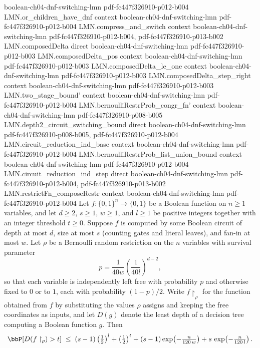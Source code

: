 \begin{theorem}
  {boolean-ch04-dnf-switching-lmn}
  {pdf-fc447f326910-p012-b004}
\proofstep
  {LMN.or_children_have_dnf}
  {context}
  {boolean-ch04-dnf-switching-lmn}
  {pdf-fc447f326910-p012-b004}
\proofstep
  {LMN.compress_and_switch}
  {context}
  {boolean-ch04-dnf-switching-lmn}
  {pdf-fc447f326910-p012-b004,
    pdf-fc447f326910-p013-b002}
\proofstep
  {LMN.composedDelta}
  {direct}
  {boolean-ch04-dnf-switching-lmn}
  {pdf-fc447f326910-p012-b003}
\proofstep
  {LMN.composedDelta_pos}
  {context}
  {boolean-ch04-dnf-switching-lmn}
  {pdf-fc447f326910-p012-b003}
\proofstep
  {LMN.composedDelta_le_one}
  {context}
  {boolean-ch04-dnf-switching-lmn}
  {pdf-fc447f326910-p012-b003}
\proofstep
  {LMN.composedDelta_step_right}
  {context}
  {boolean-ch04-dnf-switching-lmn}
  {pdf-fc447f326910-p012-b003}
\proofstep
  {LMN.two_stage_bound'}
  {context}
  {boolean-ch04-dnf-switching-lmn}
  {pdf-fc447f326910-p012-b004}
\proofstep
  {LMN.bernoulliRestrProb_congr_fn'}
  {context}
  {boolean-ch04-dnf-switching-lmn}
  {pdf-fc447f326910-p008-b005}
\proofstep
  {LMN.depth2_circuit_switching_bound}
  {direct}
  {boolean-ch04-dnf-switching-lmn}
  {pdf-fc447f326910-p008-b005,
    pdf-fc447f326910-p012-b004}
\proofstep
  {LMN.circuit_reduction_ind_base}
  {context}
  {boolean-ch04-dnf-switching-lmn}
  {pdf-fc447f326910-p012-b004}
\proofstep
  {LMN.bernoulliRestrProb_list_union_bound}
  {context}
  {boolean-ch04-dnf-switching-lmn}
  {pdf-fc447f326910-p012-b004}
\proofstep
  {LMN.circuit_reduction_ind_step}
  {direct}
  {boolean-ch04-dnf-switching-lmn}
  {pdf-fc447f326910-p012-b004,
    pdf-fc447f326910-p013-b002}
\proofstep
  {LMN.restrictFn_composeRestr}
  {context}
  {boolean-ch04-dnf-switching-lmn}
  {pdf-fc447f326910-p012-b004}
Let $f\colon\{0,1\}^n\to\{0,1\}$ be a Boolean function on $n\ge 1$ variables, and let
$d\ge 2$, $s\ge 1$, $w\ge 1$, and $l\ge 1$ be positive integers together with an integer
threshold $t\ge 0$. Suppose $f$ is computed by some Boolean circuit of depth at most
$d$, size at most $s$ (counting gates and literal leaves), and fan-in at most $w$. Let
$\rho$ be a Bernoulli random restriction on the $n$ variables with survival parameter
\[
  p = \frac{1}{40w}\left(\frac{1}{40l}\right)^{d-2},
\]
so that each variable is independently left free with probability $p$ and otherwise
fixed to $0$ or to $1$, each with probability $(1-p)/2$. Write $f\restriction_\rho$ for
the function obtained from $f$ by substituting the values $\rho$ assigns and keeping the
free coordinates as inputs, and let $D(g)$ denote the least depth of a decision tree
computing a Boolean function $g$. Then
\[
  \bbP\!\left[D(f\restriction_\rho) > t\right]
  \;\le\; (s-1)\left(\tfrac{1}{2}\right)^{l} + \left(\tfrac{1}{2}\right)^{t}
    + (s-1)\exp\!\left(-\tfrac{n}{120\,w}\right)
    + s\,\exp\!\left(-\tfrac{n}{120\,l}\right).
\]
\end{theorem}

